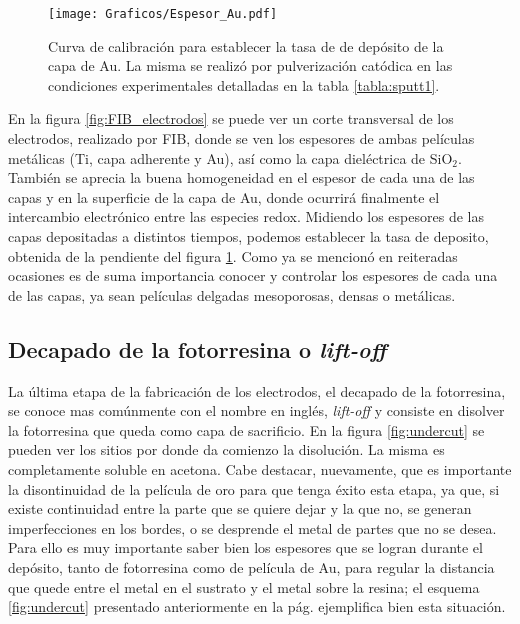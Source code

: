					   		\begin{figure}[ht!]
					   		\begin{center}
							\texttt{[image: Graficos/Espesor\_Au.pdf]}
							\caption[Curva de calibración para el espesor de los electrodos]{Curva de calibración para establecer la tasa de de depósito de la capa de Au. La misma se realizó por pulverización catódica en las condiciones experimentales detalladas en la tabla \ref{tabla:sputt1}.}
							\label{fig:calibracionAu}
							\end{center}
							\end{figure}
		
		 En la figura \ref{fig:FIB_electrodos} se puede ver un corte transversal de los electrodos, realizado por FIB, donde se ven los espesores de ambas películas metálicas (Ti, capa adherente y Au), así como la capa dieléctrica de SiO$_2$. También se aprecia la buena homogeneidad en el espesor de cada una de las capas y en la superficie de la capa de Au, donde ocurrirá finalmente el intercambio electrónico entre las especies redox. Midiendo los espesores de las capas depositadas a distintos tiempos, podemos establecer la tasa de deposito, obtenida de la pendiente del figura \ref{fig:calibracionAu}. Como ya se mencionó en reiteradas ocasiones es de suma importancia conocer y controlar los espesores de cada una de las capas, ya sean películas delgadas mesoporosas, densas o metálicas.
		
  		\subsection{Decapado de la fotorresina o\textit{ lift-off}}


		 La última etapa de la fabricación de los electrodos, el decapado de la fotorresina, se conoce mas comúnmente con el nombre en inglés, \textit{lift-off} y consiste en disolver la fotorresina que queda como capa de sacrificio. En la figura \ref{fig:undercut} se pueden ver los sitios por donde da comienzo la disolución. La misma es completamente soluble en acetona. Cabe destacar, nuevamente, que es importante la disontinuidad de la película de oro para que tenga éxito esta etapa, ya que, si existe continuidad entre la parte que se quiere dejar y la que no, se generan imperfecciones en los bordes, o se desprende el metal de partes que no se desea. Para ello es muy importante saber bien los espesores que se logran durante el depósito, tanto de fotorresina como de película de Au, para regular la distancia que quede entre el metal en el sustrato y el metal sobre la resina; el esquema \ref{fig:undercut} presentado anteriormente en la pág. \pageref{fig:undercut} ejemplifica bien esta situación.

